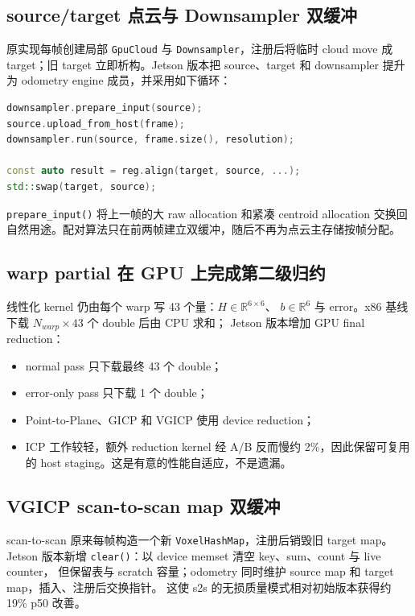 \documentclass[UTF8,a4paper,11pt,fontset=none]{ctexart}
\begin{document}
\subsection{source/target 点云与 Downsampler 双缓冲}

原实现每帧创建局部 \texttt{GpuCloud} 与 \texttt{Downsampler}，注册后将临时 cloud move
成 target；旧 target 立即析构。Jetson 版本把 source、target 和 downsampler 提升为
odometry engine 成员，并采用如下循环：

\begin{lstlisting}[style=reportcode,language=C++]
downsampler.prepare_input(source);
source.upload_from_host(frame);
downsampler.run(source, frame.size(), resolution);

const auto result = reg.align(target, source, ...);
std::swap(target, source);
\end{lstlisting}

\texttt{prepare\_input()} 将上一帧的大 raw allocation 和紧凑 centroid allocation 交换回
自然用途。配对算法只在前两帧建立双缓冲，随后不再为点云主存储按帧分配。

\subsection{warp partial 在 GPU 上完成第二级归约}

线性化 kernel 仍由每个 warp 写 43 个量：$H\in\mathbb{R}^{6\times6}$、
$b\in\mathbb{R}^{6}$ 与 error。x86 基线下载 $N_{warp}\times43$ 个 double 后由 CPU 求和；
Jetson 版本增加 GPU final reduction：

\begin{itemize}
  \item normal pass 只下载最终 43 个 double；
  \item error-only pass 只下载 1 个 double；
  \item Point-to-Plane、GICP 和 VGICP 使用 device reduction；
  \item ICP 工作较轻，额外 reduction kernel 经 A/B 反而慢约 2\%，因此保留可复用的
        host staging。这是有意的性能自适应，不是遗漏。
\end{itemize}

\subsection{VGICP scan-to-scan map 双缓冲}

scan-to-scan 原来每帧构造一个新 \texttt{VoxelHashMap}，注册后销毁旧 target map。
Jetson 版本新增 \texttt{clear()}：以 device memset 清空 key、sum、count 与 live counter，
但保留表与 scratch 容量；odometry 同时维护 source map 和 target map，插入、注册后交换指针。
这使 s2s 的无损质量模式相对初始版本获得约 19\% p50 改善。
\end{document}
